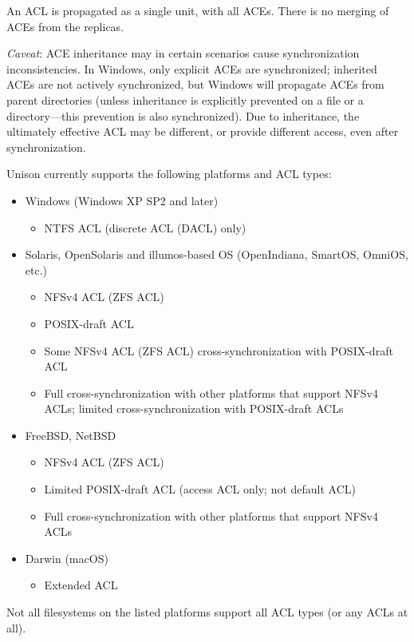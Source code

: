 \documentclass{article}
\begin{document}
An ACL is propagated as a single unit, with all ACEs. There is no
merging of ACEs from the replicas.

{\em Caveat}: ACE inheritance may in certain scenarios cause synchronization
inconsistencies. In Windows, only explicit ACEs are synchronized; inherited
ACEs are not actively synchronized, but Windows will propagate ACEs from parent
directories (unless inheritance is explicitly prevented on a file or a
directory---this prevention is also synchronized). Due to inheritance, the
ultimately effective ACL may be different, or provide different access, even
after synchronization.

Unison currently supports the following platforms and ACL types:
\begin{itemize}
  \item Windows (Windows XP SP2 and later)
  \begin{itemize}
    \item NTFS ACL (discrete ACL (DACL) only)
  \end{itemize}
\item Solaris, OpenSolaris and illumos-based OS (OpenIndiana, SmartOS,
  OmniOS, etc.)
  \begin{itemize}
  \item NFSv4 ACL (ZFS ACL)
  \item POSIX-draft ACL
  \item Some NFSv4 ACL (ZFS ACL) cross-synchronization with
  POSIX-draft ACL
  \item Full cross-synchronization with other platforms that support
  NFSv4 ACLs; limited cross-syn\-chro\-niza\-tion with POSIX-draft ACLs
  \end{itemize}
\item FreeBSD, NetBSD
  \begin{itemize}
  \item NFSv4 ACL (ZFS ACL)
  \item Limited POSIX-draft ACL (access ACL only; not default ACL)
  \item Full cross-synchronization with other platforms that support
  NFSv4 ACLs
  \end{itemize}
\item Darwin (macOS)
  \begin{itemize}
  \item Extended ACL
  \end{itemize}
\end{itemize}
Not all filesystems on the listed platforms support all ACL types
(or any ACLs at all).
\end{document}
